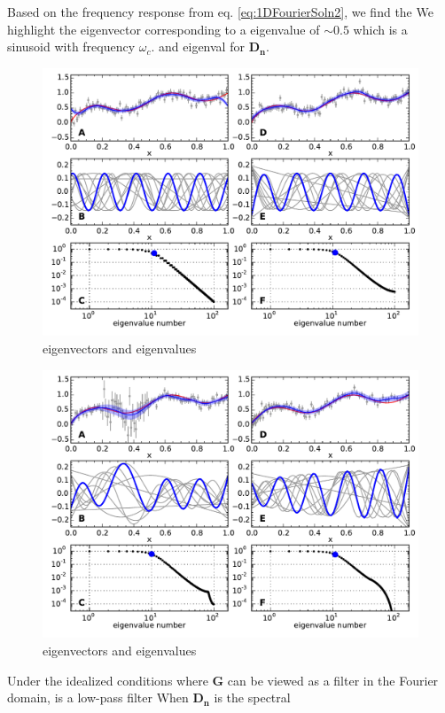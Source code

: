 \documentclass[10pt,a4paper]{article}
\begin{document}
Based on the frequency response from eq. \ref{eq:1DFourierSoln2}, we find the   We highlight the eigenvector corresponding to a eigenvalue of ${\sim}0.5$ which is a sinusoid with frequency $\omega_c$.    and eigenval   for $\mathbf{D_n}$.      

\begin{figure}
\includegraphics[scale=1.0]{figures/figure2}
\caption{eigenvectors and eigenvalues}   
\label{fig:Demo1}
\end{figure}

\begin{figure}
\includegraphics[scale=1.0]{figures/figure3}
\caption{eigenvectors and eigenvalues}   
\label{fig:Demo2}
\end{figure}

Under the idealized conditions where $\mathbf{G}$ can be viewed as a filter in the Fourier domain, is a low-pass filter When $\mathbf{D_n}$ is the spectral   
\end{document}
